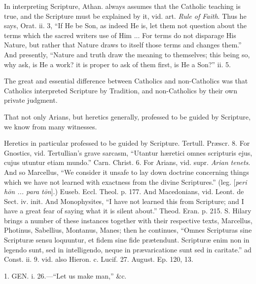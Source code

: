 In interpreting Scripture, Athan. always assumes
that the Catholic teaching is true, and the Scripture must be
explained by it, vid. art. \emph{Rule of Faith}. Thus he says, Orat.
ii. 3, ``If He be Son, as indeed He is, let them not question about the
terms which the sacred writers use of Him ... For terms do not
disparage His Nature, but rather that Nature draws to itself those
terms and changes them.'' And presently, ``Nature and truth draw the
meaning to themselves; this being so, why ask, is He a work? it is
proper to ask of them first, is He a Son?'' ii. 5.

The great and essential difference between
Catholics and non-Catholics was that Catholics interpreted Scripture
by Tradition, and non-Catholics by their own private judgment.

That not only Arians, but heretics generally,
professed to be guided by Scripture, we know from many witnesses.

Heretics in particular professed to be guided by
Scripture. Tertull. Præscr. 8. For Gnostics, vid. Tertullian's grave
sarcasm, ``Utantur hæretici omnes scripturis ejus, cujus utuntur etiam
mundo.'' Carn. Christ. 6. For Arians, vid. supr. \emph{Arian tenets}.
And so Marcellus, ``We consider it unsafe to lay down doctrine
concerning things which we have not learned with exactness from the
divine Scriptures.'' (leg. [\emph{peri h\={o}n ... para t\={o}n}].)
Euseb. Eccl. Theol. p. 177. And Macedonians, vid. Leont. de Sect. iv.
init. And Monophysites, ``I have not learned this from Scripture; and I
have a great fear of saying what it is silent about.'' Theod. Eran. p.
215. S. Hilary brings a number of these instances together with their
respective texts, Marcellus, Photinus, Sabellius, Montanus, Manes;
then he continues, ``Omnes Scripturas sine Scripturæ sensu loquuntur,
et fidem sine fide prætendunt. Scripturæ enim non in legendo sunt,
sed in intelligendo, neque in prævaricatione sunt sed in caritate.''
ad Const. ii. 9. vid. also Hieron. c. Lucif. 27. August. Ep. 120, 13.


1. GEN.
i. 26.—``Let us make man,'' \&c.

